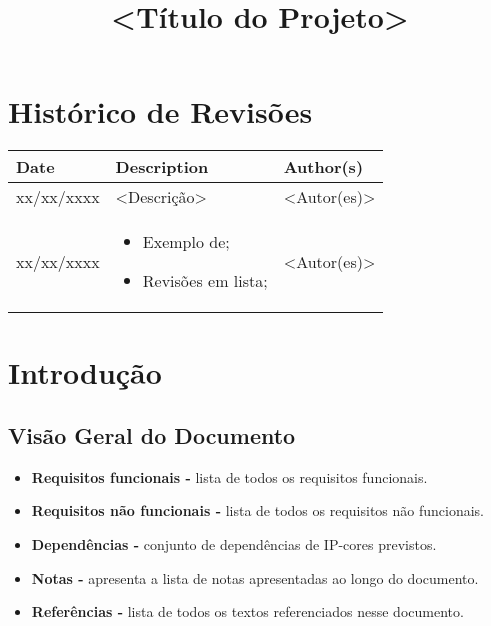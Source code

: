 \documentclass{article}
\title{<Título do Projeto>}
\begin{document}
\newpage

\section*{\center Histórico de Revisões}
  \vspace*{1cm}
  \begin{table}[ht]
    \centering
    \begin{tabular}[pos]{|m{2cm} | m{7.2cm} | m{3.8cm}|} 
      \hline
      \cellcolor[gray]{0.9}
      \textbf{Date} & \cellcolor[gray]{0.9}\textbf{Description} & \cellcolor[gray]{0.9}\textbf{Author(s)}\\ \hline
      \hline
      \small xx/xx/xxxx & \small <Descrição> & \small <Autor(es)> \\ \hline      
      \small xx/xx/xxxx &
      \begin{small}
        \begin{itemize}
          \item Exemplo de;
          \item Revisões em lista;
        \end{itemize}
      \end{small} & \small <Autor(es)> \\ \hline 
    \end{tabular}
  \end{table}

\newpage

\tableofcontents
\newpage

\section{Introdução}

\subsection{Visão Geral do Documento}
  \begin{itemize}
   \item \textbf{Requisitos funcionais -} lista de todos os requisitos funcionais.
   \item \textbf{Requisitos não funcionais -} lista de todos os requisitos não funcionais.
   \item \textbf{Dependências -} conjunto de dependências de IP-cores previstos.
   \item \textbf{Notas -} apresenta a lista de notas apresentadas ao longo do documento.
   \item \textbf{Referências -} lista de todos os textos referenciados nesse documento.
  \end{itemize}
\end{document}
